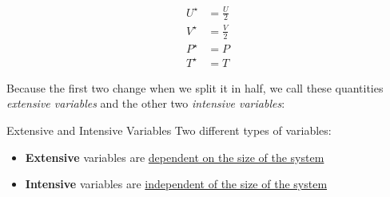 \documentclass{book}
\theoremstyle{plain}
\begin{document}
              \begin{align*}
                U^\star &= \frac{U}{2}\\
                V^\star &= \frac{V}{2}\\
                P^\star &= P\\
                T^\star &= T
              \end{align*}

              Because the first two change when we split it in half, we call these quantities \textit{extensive variables} and the other two \textit{intensive variables}:
              \begin{definition}{Extensive and Intensive Variables}{}
                Two different types of variables:
                \begin{itemize}
                  \item{\textbf{Extensive} variables are \underline{dependent on the size of the system}}
                  \item{\textbf{Intensive} variables are \underline{independent of the size of the system}}
                \end{itemize}

            \end{definition}
\end{document}

